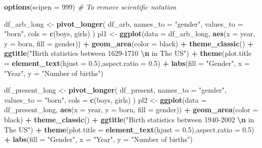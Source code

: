 \documentclass[11pt,a4paper,]{article}
\newenvironment{Shaded}{\begin{snugshade}}{\end{snugshade}}
\newcommand{\AttributeTok}[1]{\textcolor[rgb]{0.13,0.29,0.53}{#1}}
\newcommand{\CommentTok}[1]{\textcolor[rgb]{0.56,0.35,0.01}{\textit{#1}}}
\newcommand{\DecValTok}[1]{\textcolor[rgb]{0.00,0.00,0.81}{#1}}
\newcommand{\FloatTok}[1]{\textcolor[rgb]{0.00,0.00,0.81}{#1}}
\newcommand{\FunctionTok}[1]{\textcolor[rgb]{0.13,0.29,0.53}{\textbf{#1}}}
\newcommand{\NormalTok}[1]{#1}
\newcommand{\OtherTok}[1]{\textcolor[rgb]{0.56,0.35,0.01}{#1}}
\newcommand{\SpecialCharTok}[1]{\textcolor[rgb]{0.81,0.36,0.00}{\textbf{#1}}}
\newcommand{\StringTok}[1]{\textcolor[rgb]{0.31,0.60,0.02}{#1}}
\begin{document}
\begin{Shaded}
\begin{Highlighting}[]
\FunctionTok{options}\NormalTok{(}\AttributeTok{scipen =} \DecValTok{999}\NormalTok{) }\CommentTok{\# To remove scientific notation}

\NormalTok{df\_arb\_long }\OtherTok{\textless{}{-}}
  \FunctionTok{pivot\_longer}\NormalTok{(}
\NormalTok{    df\_arb,}
    \AttributeTok{names\_to =} \StringTok{"gender"}\NormalTok{,}
    \AttributeTok{values\_to =} \StringTok{"born"}\NormalTok{,}
    \AttributeTok{cols =} \FunctionTok{c}\NormalTok{(boys, girls)}
\NormalTok{  )}
\NormalTok{pl1 }\OtherTok{\textless{}{-}}
  \FunctionTok{ggplot}\NormalTok{(}\AttributeTok{data =}\NormalTok{ df\_arb\_long, }\FunctionTok{aes}\NormalTok{(}\AttributeTok{x =}\NormalTok{ year, }\AttributeTok{y =}\NormalTok{ born, }\AttributeTok{fill =}\NormalTok{ gender)) }\SpecialCharTok{+} 
  \FunctionTok{geom\_area}\NormalTok{(}\AttributeTok{color =} \StringTok{\textquotesingle{}black\textquotesingle{}}\NormalTok{) }\SpecialCharTok{+} \FunctionTok{theme\_classic}\NormalTok{() }\SpecialCharTok{+} 
  \FunctionTok{ggtitle}\NormalTok{(}\StringTok{"Birth statistics between 1629{-}1710 }\SpecialCharTok{\textbackslash{}n}\StringTok{ in The US"}\NormalTok{) }\SpecialCharTok{+} 
  \FunctionTok{theme}\NormalTok{(}\AttributeTok{plot.title =} \FunctionTok{element\_text}\NormalTok{(}\AttributeTok{hjust =} \FloatTok{0.5}\NormalTok{),}\AttributeTok{aspect.ratio =} \FloatTok{0.5}\NormalTok{) }\SpecialCharTok{+} 
  \FunctionTok{labs}\NormalTok{(}\AttributeTok{fill =} \StringTok{"Gender"}\NormalTok{, }\AttributeTok{x =} \StringTok{"Year"}\NormalTok{, }\AttributeTok{y =} \StringTok{"Number of births"}\NormalTok{)}


\NormalTok{df\_present\_long }\OtherTok{\textless{}{-}}
  \FunctionTok{pivot\_longer}\NormalTok{(}
\NormalTok{    df\_present,}
    \AttributeTok{names\_to =} \StringTok{"gender"}\NormalTok{,}
    \AttributeTok{values\_to =} \StringTok{"born"}\NormalTok{,}
    \AttributeTok{cols =} \FunctionTok{c}\NormalTok{(boys, girls)}
\NormalTok{  )}
\NormalTok{pl2 }\OtherTok{\textless{}{-}}
  \FunctionTok{ggplot}\NormalTok{(}\AttributeTok{data =}\NormalTok{ df\_present\_long, }\FunctionTok{aes}\NormalTok{(}\AttributeTok{x =}\NormalTok{ year, }\AttributeTok{y =}\NormalTok{ born, }\AttributeTok{fill =}\NormalTok{ gender)) }\SpecialCharTok{+} 
  \FunctionTok{geom\_area}\NormalTok{(}\AttributeTok{color =} \StringTok{\textquotesingle{}black\textquotesingle{}}\NormalTok{) }\SpecialCharTok{+} 
  \FunctionTok{theme\_classic}\NormalTok{() }\SpecialCharTok{+} 
  \FunctionTok{ggtitle}\NormalTok{(}\StringTok{"Birth statistics between 1940{-}2002 }\SpecialCharTok{\textbackslash{}n}\StringTok{ in The US"}\NormalTok{) }\SpecialCharTok{+} 
  \FunctionTok{theme}\NormalTok{(}\AttributeTok{plot.title =} \FunctionTok{element\_text}\NormalTok{(}\AttributeTok{hjust =} \FloatTok{0.5}\NormalTok{),}\AttributeTok{aspect.ratio =} \FloatTok{0.5}\NormalTok{) }\SpecialCharTok{+} 
  \FunctionTok{labs}\NormalTok{(}\AttributeTok{fill =} \StringTok{"Gender"}\NormalTok{, }\AttributeTok{x =} \StringTok{"Year"}\NormalTok{, }\AttributeTok{y =} \StringTok{"Number of births"}\NormalTok{)}


\end{Highlighting}
\end{Shaded}
\end{document}
